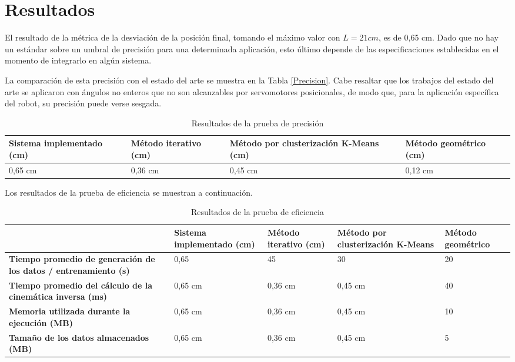 \section{Resultados}

El resultado de la métrica de la desviación de la posición final, tomando el máximo valor con $L = 21 cm$, es de 0,65 cm. Dado que no hay un estándar sobre un umbral de precisión para una determinada aplicación, esto último depende de las especificaciones establecidas en el momento de integrarlo en algún sistema.

La comparación de esta precisión con el estado del arte se muestra en la Tabla \ref{Precision}. Cabe resaltar que los trabajos del estado del arte se aplicaron con ángulos no enteros que no son alcanzables por servomotores posicionales, de modo que, para la aplicación específica del robot, su precisión puede verse sesgada.

\begin{table}[ht]
	\centering
	\begin{tabular}{p{5cm}p{4cm}p{3.6cm}p{4cm}}
		\hline
		\textbf{Sistema implementado (cm)} & \textbf{Método iterativo (cm)} & \textbf{Método por clusterización K-Means (cm)} & \textbf{Método geométrico (cm)} \\
		\hline
		0,65 cm & 0,36 cm & 0,45 cm & 0,12 cm \\
		\hline
	\end{tabular}
	\caption{Resultados de la prueba de precisión}
	\label{tab:Precision}
\end{table}

Los resultados de la prueba de eficiencia se muestran a continuación.

\begin{table}[ht]
	\centering
	\begin{tabular}{p{4cm}p{5cm}p{4cm}p{3.6cm}p{4cm}}
		\hline
	    \texbf{ISO} & \textbf{Sistema implementado (cm)} & \textbf{Método iterativo (cm)} & \textbf{Método por clusterización K-Means} & \textbf{Método geométrico} \\
		\hline
		\textbf{Tiempo promedio de generación de los datos / entrenamiento (s)} & 0,65 & 45 & 30 & 20 \\
		\textbf{Tiempo promedio del cálculo de la cinemática inversa (ms)} & 0,65 cm & 0,36 cm & 0,45 cm & 40 \\
		\textbf{Memoria utilizada durante la ejecución (MB)} & 0,65 cm & 0,36 cm & 0,45 cm & 10 \\
		\textbf{Tamaño de los datos almacenados (MB)} & 0,65 cm & 0,36 cm & 0,45 cm & 5 \\
		\hline
	\end{tabular}
	\caption{Resultados de la prueba de eficiencia}
	\label{tab:Precision}
\end{table}
